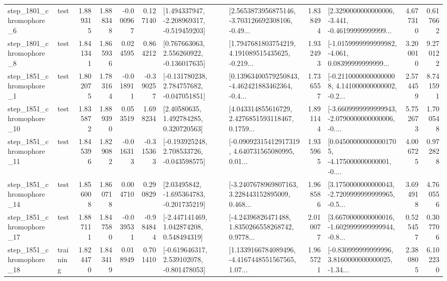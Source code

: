 \begin{tabular}{llrrrrllrlrr}
  step\_1801\_chromophore\_6 &      test &      1.889315 &    1.888348 &     -0.000967 &  0.127140 &   [1.494337947, -2.208969317, -0.519459203] &  [2.5653873956875146, -3.703126692308106, -0.49... &       1.838494 &  [2.3290000000000006, -3.441, -0.46199999999999... &            4.677310 &          0.617662 \\
  step\_1801\_chromophore\_8 &      test &      1.841341 &    1.865936 &      0.024595 &  0.864212 &    [0.767663063, 2.556260922, -0.136017635] &  [1.7947681803754219, 4.191089515435625, -0.219... &       1.932493 &  [-1.0159999999999982, -4.061, 0.08399999999999... &            3.200010 &          9.270122 \\
  step\_1851\_chromophore\_1 &      test &      1.802075 &    1.783164 &     -0.018911 & -0.390257 &   [-0.131780238, 2.784757682, -0.047051851] &  [0.13963400579250843, -4.462421883462364, -0.4... &       1.736557 &  [-0.21100000000000008, 4.141000000000002, -0.2... &            2.574459 &          8.741591 \\
 step\_1851\_chromophore\_10 &      test &      1.835872 &    1.889390 &      0.053519 &  1.698234 &      [2.40580635, 1.492784285, 0.320720563] &  [4.043314855616729, 2.4276851593118467, 0.1759... &       1.891144 &  [-3.6609999999999943, -2.0790000000000006, -0.... &            5.752673 &          1.700548 \\
 step\_1851\_chromophore\_11 &      test &      1.845396 &    1.829082 &     -0.016313 & -0.315363 &   [-0.193925248, 2.708533726, -0.043598575] &  [-0.09092315412917319, 4.640731565080995, 0.01... &       1.935965 &  [0.045000000000001705, -4.175000000000001, -0.... &            4.006725 &          0.972828 \\
 step\_1851\_chromophore\_14 &      test &      1.856008 &    1.860718 &      0.004710 &  0.290829 &    [2.03495842, -1.695364783, -0.201735219] &  [-3.2407678969807163, 3.228443152895009, 0.468... &       1.968586 &  [3.1750000000000043, -2.7209999999999965, -0.5... &            3.694918 &          4.760556 \\
 step\_1851\_chromophore\_17 &      test &      1.887111 &    1.847580 &     -0.039531 & -0.984844 &    [-2.447141469, 1.042874208, 0.548494319] &  [-4.24396826471488, 1.8350266558268742, 0.9778... &       2.010077 &  [3.6670000000000016, -1.6029999999999944, -0.8... &            0.525457 &          0.307706 \\
 step\_1851\_chromophore\_18 &  training &      1.824470 &    1.843419 &      0.018949 &  0.701410 &   [-0.619646317, 2.539102078, -0.801478053] &  [1.1339166784089496, -4.4167448551567565, 1.07... &       1.965721 &  [-0.830999999999996, 3.8160000000000025, -1.34... &            2.380805 &          6.102230 \\

\end{tabular}
